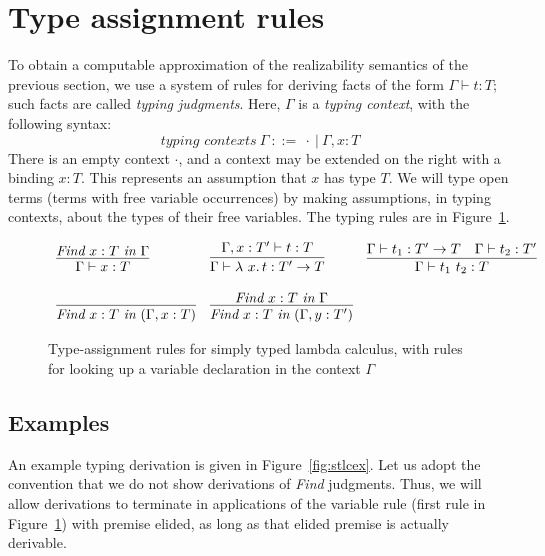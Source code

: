 \section{Type assignment rules}

To obtain a computable approximation of the realizability semantics of the previous section,
we use a system of rules for deriving facts of the form $\Gamma \vdash t : T$; such facts
are called \emph{typing judgments}.  Here, $\Gamma$
is a \emph{typing context}, with the following syntax:
\[
\textit{typing contexts}\ \Gamma\ ::=\ \cdot\ |\ \Gamma , x : T
\]
\noindent There is an empty context $\cdot$, and a context may be
extended on the right with a binding $x : T$.  This represents an
assumption that $x$ has type $T$.  We will type open terms (terms with
free variable occurrences) by making assumptions, in typing contexts,
about the types of their free variables.  The typing rules are in Figure~\ref{fig:stlctpassign}.

\begin{figure}
\[
\begin{array}{lll}
\infer{\Gamma\vdash x : T}{\textit{Find}\ x:T\ \textit{in}\ \Gamma} 

&

\infer{\Gamma\vdash \lam{x}{t} : T' \to T}
      {\Gamma,x:T'\vdash t:T}

&

\infer{\Gamma\vdash t_1\ t_2 : T}
      {\Gamma\vdash t_1 : T' \to T &
       \Gamma\vdash t_2 : T'}
      \\
      \\

\infer{\textit{Find}\ x:T\ \textit{in}\ (\Gamma, x:T)}{\ }

&

\infer{\textit{Find}\ x:T\ \textit{in}\ (\Gamma, y:T')}{\textit{Find}\ x:T\ \textit{in}\ \Gamma}

&

\ 
\end{array}
\]
\caption{Type-assignment rules for simply typed lambda calculus, with rules for looking up a variable declaration in the context $\Gamma$}
\label{fig:stlctpassign}
\end{figure}

\subsection{Examples}

An example typing derivation is given in Figure~\ref{fig:stlcex}.  Let us adopt the convention that
we do not show derivations of \textit{Find} judgments.  Thus, we will allow derivations to terminate
in applications of the variable rule (first rule in Figure~\ref{fig:stlctpassign}) with premise elided, as long
as that elided premise is actually derivable.

